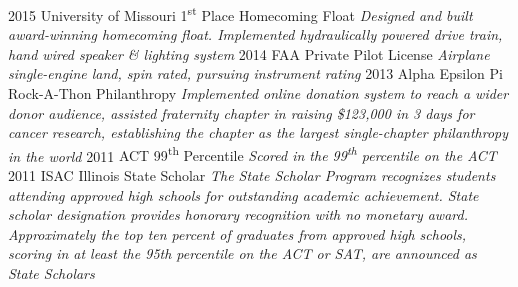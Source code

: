 \documentclass[print]{gunn-resume}
\begin{document}
\begin{entrylist}
  \entry
    {2015}
    {University of Missouri 1\textsuperscript{st} Place Homecoming Float}
    {}
    {\emph{Designed and built award-winning homecoming float. Implemented hydraulically powered drive train, hand wired speaker \& lighting system}}
  \entry
    {2014}
    {FAA Private Pilot License}
    {}
    {\emph{Airplane single-engine land, spin rated, pursuing instrument rating}}
  \entry
    {2013}
    {Alpha Epsilon Pi Rock-A-Thon Philanthropy}
    {}
    {\emph{Implemented online donation system to reach a wider donor audience, assisted  fraternity chapter in raising \$123,000 in 3 days for cancer research, establishing the chapter as the largest single-chapter philanthropy in the world}}
  \entry
    {2011}
    {ACT 99\textsuperscript{th} Percentile}
    {}
    {\emph{Scored in the 99\textsuperscript{th} percentile on the ACT}}
    \entry
    {2011}
    {ISAC Illinois State Scholar}
    {}
    {\emph{The State Scholar Program recognizes students attending approved high schools for outstanding academic achievement. State scholar designation provides honorary recognition with no monetary award. Approximately the top ten percent of graduates from approved high schools, scoring in at least the 95th percentile on the ACT or SAT, are announced as State Scholars}}
\end{entrylist}
\end{document}
